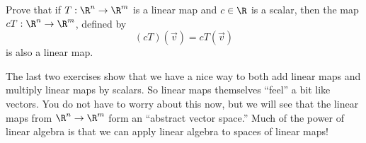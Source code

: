 \documentclass{ximera}
\begin{document}
Prove that if $T:\R^n \to \R^m$ is a linear map and $c \in \R$ is a scalar, then the map $cT:\R^n \to \R^m$,  defined by 
\[(cT)(\vec{v}) = cT(\vec{v})\] is also a linear map.
  
\begin{free-response}
\end{free-response}


\begin{observation}
  The last two exercises show that we have a nice way to both add
  linear maps and multiply linear maps by scalars.  So linear maps
  themselves ``feel'' a bit like vectors.  You do not have to worry
  about this now, but we will see that the linear maps from $\R^n \to
  \R^m$ form an ``abstract vector space.''  Much of the power of
  linear algebra is that we can apply linear algebra to spaces of
  linear maps!
\end{observation}
	
\end{document}
